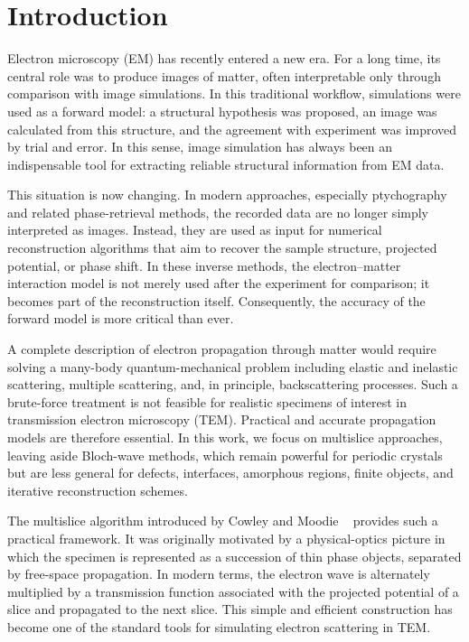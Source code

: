 \documentclass[preprint,12pt,number]{elsarticle}
\begin{document}
\section{Introduction}
\label{sec:introduction}

Electron microscopy (EM) has recently entered a new era. For a long time, its central role was to produce images of matter, often interpretable only through comparison with image simulations. In this traditional workflow, simulations were used as a forward model: a structural hypothesis was proposed, an image was calculated from this structure, and the agreement with experiment was improved by trial and error. In this sense, image simulation has always been an indispensable tool for extracting reliable structural information from EM data.

This situation is now changing. In modern approaches, especially ptychography and related phase-retrieval methods, the recorded data are no longer simply interpreted as images. Instead, they are used as input for numerical reconstruction algorithms that aim to recover the sample structure, projected potential, or phase shift. In these inverse methods, the electron–matter interaction model is not merely used after the experiment for comparison; it becomes part of the reconstruction itself. Consequently, the accuracy of the forward model is more critical than ever.

A complete description of electron propagation through matter would require solving a many-body quantum-mechanical problem including elastic and inelastic scattering, multiple scattering, and, in principle, backscattering processes. Such a brute-force treatment is not feasible for realistic specimens of interest in transmission electron microscopy (TEM). Practical and accurate propagation models are therefore essential. In this work, we focus on multislice approaches, leaving aside Bloch-wave methods, which remain powerful for periodic crystals ~\cite{Bethe_theorie_1928,Hirsch1965} but are less general for defects, interfaces, amorphous regions, finite objects, and iterative reconstruction schemes.

The multislice algorithm introduced by Cowley and Moodie ~\cite{cowley1957scattering,ishizuka1977practical} provides such a practical framework. It was originally motivated by a physical-optics picture in which the specimen is represented as a succession of thin phase objects, separated by free-space propagation. In modern terms, the electron wave is alternately multiplied by a transmission function associated with the projected potential of a slice and propagated to the next slice. This simple and efficient construction has become one of the standard tools for simulating electron scattering in TEM.
\end{document}
